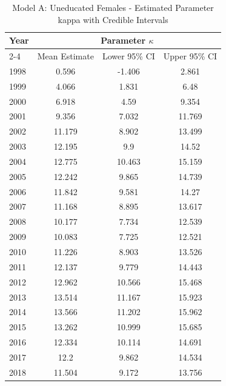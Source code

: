 \begin{landscape}
\begin{table}[htbp]
\centering
\caption{Model A: Uneducated Females - Estimated Parameter kappa with Credible Intervals}
\label{tab:parameters_k1}
\begin{tabular}{@{}lccc@{}}
\toprule
Year & \multicolumn{3}{c}{Parameter \(\kappa\)} \\
\cmidrule(lr){2-4}
      & Mean Estimate & Lower 95\% CI & Upper 95\% CI \\
\midrule
1998 & 0.596 & -1.406 & 2.861 \\
1999 & 4.066 & 1.831 & 6.48 \\
2000 & 6.918 & 4.59 & 9.354 \\
2001 & 9.356 & 7.032 & 11.769 \\
2002 & 11.179 & 8.902 & 13.499 \\
2003 & 12.195 & 9.9 & 14.52 \\
2004 & 12.775 & 10.463 & 15.159 \\
2005 & 12.242 & 9.865 & 14.739 \\
2006 & 11.842 & 9.581 & 14.27 \\
2007 & 11.168 & 8.895 & 13.617 \\
2008 & 10.177 & 7.734 & 12.539 \\
2009 & 10.083 & 7.725 & 12.521 \\
2010 & 11.226 & 8.903 & 13.526 \\
2011 & 12.137 & 9.779 & 14.443 \\
2012 & 12.962 & 10.566 & 15.468 \\
2013 & 13.514 & 11.167 & 15.923 \\
2014 & 13.566 & 11.202 & 15.962 \\
2015 & 13.262 & 10.999 & 15.685 \\
2016 & 12.334 & 10.114 & 14.691 \\
2017 & 12.2 & 9.862 & 14.534 \\
2018 & 11.504 & 9.172 & 13.756 \\
\bottomrule
\end{tabular}
\end{table}
\end{landscape}